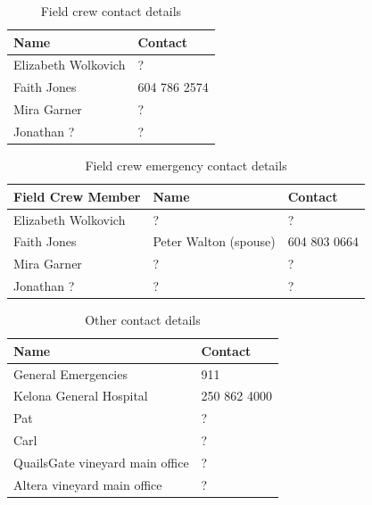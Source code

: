 \documentclass[11pt,letter]{article}
\begin{document}
\begin{table}[H]
\caption{Field crew contact details} %
\begin{tabular}{ l | l }  %
\hline\hline %
Name & Contact\\ [0.5ex] %
\hline %
Elizabeth Wolkovich & ? \\ %
Faith Jones & 604 786 2574 \\
Mira Garner & ? \\
Jonathan ? & ? \\

\hline %
\end{tabular}
\label{table:nonlin} %
\end{table}

\begin{table}[H]
\caption{Field crew emergency contact details} %
\begin{tabular}{l l l} %
\hline\hline %
Field Crew Member & Name & Contact\\ [0.5ex] %
\hline %
Elizabeth Wolkovich & ? & ? \\ %
Faith Jones & Peter Walton (spouse) & 604 803 0664\\
Mira Garner & ? & ? \\
Jonathan ? & ? & ? \\

\hline %
\end{tabular}
\label{table:nonlin} %
\end{table}

\begin{table}[H]
\caption{Other contact details} %
\begin{tabular}{l l} %
\hline\hline %
Name & Contact \\ [0.5ex] %
\hline %
General Emergencies & 911 \\ %
Kelona General Hospital & 250 862 4000 \\
Pat & ?\\
Carl & ?\\
QuailsGate vineyard main office & ? \\
Altera vineyard main office & ? \\

\hline %
\end{tabular}
\label{table:nonlin} %
\end{table}
\end{document}
